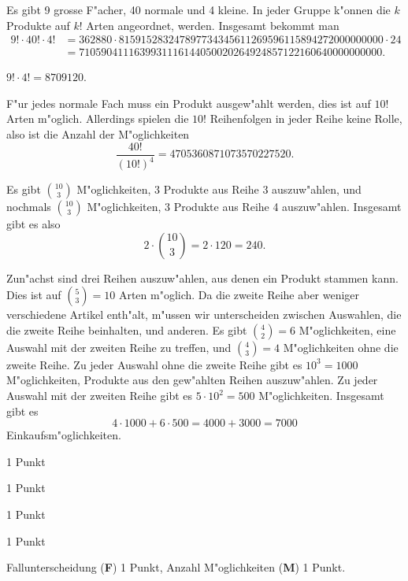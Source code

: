 \begin{loesung}
\begin{teilaufgaben}
\item Es gibt 9 grosse F"acher, 40 normale und 4 kleine. In jeder Gruppe
k"onnen die $k$ Produkte auf $k!$ Arten angeordnet, werden. Insgesamt 
bekommt man
\begin{align*}
9!\cdot 40!\cdot 4!&=
362880\cdot 815915283247897734345611269596115894272000000000 \cdot 24
\\
&=7105904111639931116144050020264924857122160640000000000.
\end{align*}
\item $9!\cdot 4!=8709120$.
\item
F"ur jedes normale Fach muss ein Produkt ausgew"ahlt werden, dies ist
auf $10!$ Arten m"oglich. Allerdings spielen die $10!$ Reihenfolgen
in jeder Reihe keine Rolle, also ist die Anzahl der M"oglichkeiten
\[
\frac{40!}{(10!)^4}=4705360871073570227520.
\]
\item
Es gibt $\binom{10}{3}$ M"oglichkeiten, $3$ Produkte aus Reihe 3
auszuw"ahlen, und nochmals $\binom{10}{3}$ M"oglichkeiten, $3$ Produkte
aus Reihe 4 auszuw"ahlen. Insgesamt gibt es also 
\[
2\cdot\binom{10}{3}=2\cdot 120=240.
\]
\item
Zun"achst sind drei Reihen auszuw"ahlen, aus denen ein Produkt stammen
kann.
Dies ist auf $\binom{5}{3}=10$ Arten m"oglich.
Da die zweite Reihe aber weniger verschiedene Artikel enth"alt, m"ussen
wir unterscheiden zwischen Auswahlen, die die zweite Reihe beinhalten,
und anderen.
Es gibt $\binom{4}{2}=6$ M"oglichkeiten, eine Auswahl mit der zweiten
Reihe zu treffen, und $\binom{4}{3}=4$ M"oglichkeiten ohne die zweite Reihe.
Zu jeder Auswahl ohne die zweite Reihe gibt es $10^3=1000$ M"oglichkeiten,
Produkte aus den gew"ahlten Reihen auszuw"ahlen.
Zu jeder Auswahl mit der zweiten Reihe gibt es $5\cdot 10^2=500$ M"oglichkeiten.
Insgesamt gibt es 
\[
4\cdot 1000
+
6\cdot 500
=4000 + 3000=7000
\]
Einkaufsm"oglichkeiten.
\end{teilaufgaben}
\end{loesung}

\begin{bewertung}
\begin{teilaufgaben}
\item 1 Punkt
\item 1 Punkt
\item 1 Punkt
\item 1 Punkt
\item Fallunterscheidung (\textbf{F}) 1 Punkt,
Anzahl M"oglichkeiten (\textbf{M}) 1 Punkt.
\end{teilaufgaben}
\end{bewertung}

